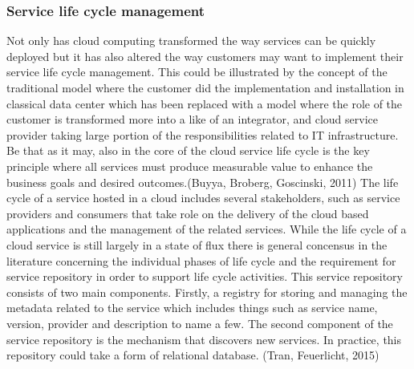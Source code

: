 \documentclass{article}
\begin{document}
\subsubsection{Service life cycle management}
Not only has cloud computing transformed the way services can be quickly deployed but it has also altered the way customers may want to implement their service life cycle management.
This could be illustrated by the concept of the traditional model where the customer did the implementation and installation in classical data center which has been replaced with a model where the role of the customer is transformed more into a like of an integrator, and cloud service provider taking large portion of the responsibilities related to IT infrastructure. Be that as it may, also in the core of the cloud service life cycle is the key principle where all services must produce measurable value to enhance the business goals and desired outcomes.(Buyya, Broberg, Goscinski, 2011)
The life cycle of a service hosted in a cloud includes several stakeholders, such as service providers and consumers that take role on the delivery of the cloud based applications and the management of the related services. While the life cycle of a cloud service is still largely in a state of flux there is general concensus in the literature concerning the individual phases of life cycle and the requirement for service repository in order to support life cycle activities.
This service repository consists of two main components. Firstly, a registry for storing and managing the metadata related to the service which includes things such as service name, version, provider and description to name a few. The second component of the service repository is the mechanism that discovers new services. In practice, this repository could take a form of relational database. (Tran, Feuerlicht, 2015)
\par
\end{document}
